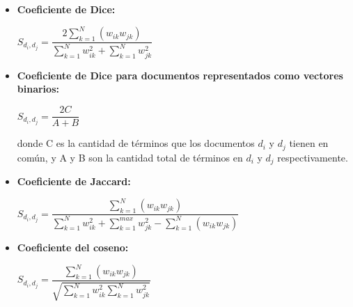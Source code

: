 \documentclass{llncs}
\begin{document}
\begin{itemize}
	\item \textbf{Coeficiente de Dice:}
	\begin{center}
		$ S_{d_{i}, d_{j}} = \dfrac{2 \sum_{k=1}^{N} (w_{ik}w_{jk})}{\sum_{k=1}^{N}w_{ik}^{2} + \sum_{k=1}^{N}w_{jk}^{2}} $
	\end{center}
	\item \textbf{Coeficiente de Dice para documentos representados como vectores binarios:}
	\begin{center}
		$ S_{d_{i}, d_{j}} = \dfrac{2C}{A+B} $
	\end{center}
	donde C es la cantidad de t\'erminos que los documentos $ d_{i} $ y $ d_{j} $ tienen en com\'un, y A y B son la cantidad total de t\'erminos en $ d_{i} $ y $ d_{j} $ respectivamente.
	\item \textbf{Coeficiente de Jaccard:}
	\begin{center}
		$ S_{d_{i}, d_{j}} = \dfrac{\sum_{k=1}^{N} (w_{ik}w_{jk})}{\sum_{k=1}^{N}w_{ik}^{2} + \sum_{k=1}^{max}w_{jk}^{2} - \sum_{k=1}^{N} (w_{ik}w_{jk})} $
	\end{center}
	\item \textbf{Coeficiente del coseno:}
	\begin{center}
		$ S_{d_{i}, d_{j}} = \dfrac{\sum_{k=1}^{N} (w_{ik}w_{jk})}{\sqrt{\sum_{k=1}^{N}w_{ik}^{2} \sum_{k=1}^{N}w_{jk}^{2}}} $
	\end{center}
\end{itemize}
\end{document}
